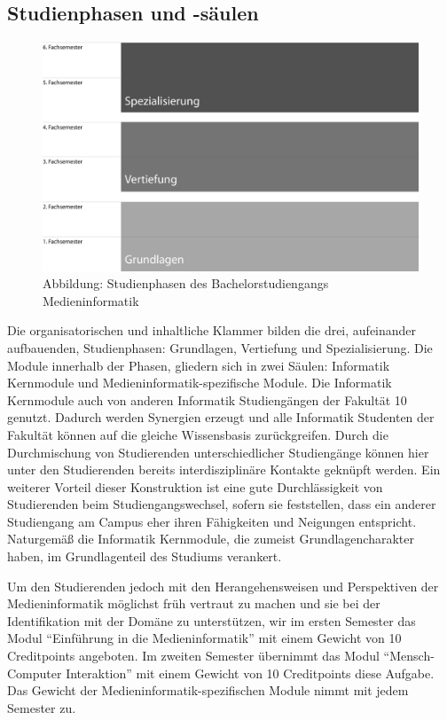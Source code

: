 \subsection{Studienphasen und
-säulen}\label{studienphasen-und--suxe4ulen}

\begin{figure}[htbp][htbp]
\centering
\includegraphics[width=\columnwidth]{../anhaenge/bilder/ba-studienphasen.png}
\caption{Abbildung: Studienphasen des Bachelorstudiengangs
Medieninformatik}
\end{figure}

Die organisatorischen und inhaltliche Klammer bilden die drei,
aufeinander aufbauenden, Studienphasen: Grundlagen, Vertiefung und
Spezialisierung. Die Module innerhalb der Phasen, gliedern sich in zwei
Säulen: Informatik Kernmodule und Medieninformatik-spezifische Module.
Die Informatik Kernmodule auch von anderen Informatik Studiengängen der
Fakultät 10 genutzt. Dadurch werden Synergien erzeugt und alle
Informatik Studenten der Fakultät können auf die gleiche Wissensbasis
zurückgreifen. Durch die Durchmischung von Studierenden
unterschiedlicher Studiengänge können hier unter den Studierenden
bereits interdisziplinäre Kontakte geknüpft werden. Ein weiterer Vorteil
dieser Konstruktion ist eine gute Durchlässigkeit von Studierenden beim
Studiengangswechsel, sofern sie feststellen, dass ein anderer
Studiengang am Campus eher ihren Fähigkeiten und Neigungen entspricht.
Naturgemäß die Informatik Kernmodule, die zumeist Grundlagencharakter
haben, im Grundlagenteil des Studiums verankert.

Um den Studierenden jedoch mit den Herangehensweisen und Perspektiven
der Medieninformatik möglichst früh vertraut zu machen und sie bei der
Identifikation mit der Domäne zu unterstützen, wir im ersten Semester
das Modul ``Einführung in die Medieninformatik'' mit einem Gewicht von
10 Creditpoints angeboten. Im zweiten Semester übernimmt das Modul
``Mensch-Computer Interaktion'' mit einem Gewicht von 10 Creditpoints
diese Aufgabe. Das Gewicht der Medieninformatik-spezifischen Module
nimmt mit jedem Semester zu.

